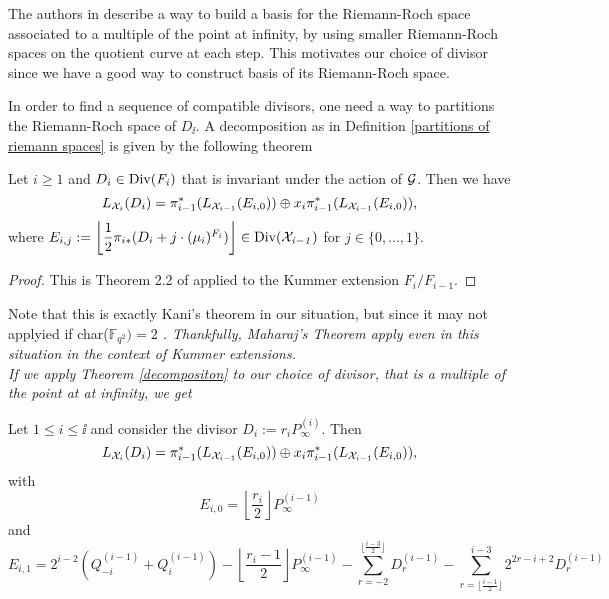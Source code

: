 \documentclass[10pt]{article}
\begin{document}
\s

\begin{rq1} \label{choice of P_inf}
The authors in \cite{NOQ} describe a way to build a basis for the Riemann-Roch space associated to a multiple of the point at infinity, by using smaller Riemann-Roch spaces on the quotient curve at each step. This motivates our choice of divisor since we have a good way to construct basis of its Riemann-Roch space.
\end{rq1}

\s

In order to find a sequence of compatible divisors, one need a way to partitions the Riemann-Roch space of $D_{\ii}$. A decomposition as in Definition \ref{partitions of riemann spaces} is given by the following theorem 

\s

\begin{theorem} \label{decompositon}
Let $i \geq 1$ and $D_i \in \rm Div \it (F_i)$ that is invariant under the action of $\mathcal{G}$. Then we have 
\[L_{\mathcal{X}_i}(D_i) = \pi_{i-1}^*(L_{\mathcal{X}_{i-1}}(E_{i,0})) \oplus  x_i \pi_{i-1}^*(L_{\mathcal{X}_{i-1}}(E_{i,0})),\]
where $E_{i,j} := \left\lfloor \dfrac{1}{2} \pi_{i*}(D_i+j \cdot (\mu_i)^{F_i})\right\rfloor \in \rm Div \it (\mathcal{X}_{i-1})$ for $j \in \{0,...,1\}$.
\end{theorem}

\s

\begin{proof}
This is Theorem 2.2 of \cite{MAH} applied to the Kummer extension $F_i/F_{i-1}$.
\end{proof}

\s

Note that this is exactly Kani's theorem in our situation, but since it may not applyied if char(\it $\mathbb{F}_{q^2})=2$ \rm . Thankfully, Maharaj's Theorem apply even in this situation in the context of Kummer extensions. \\
If we apply Theorem \ref{decompositon} to our choice of divisor, that is a multiple of the point at at infinity, we get

\s

\begin{corollary} \label{our decomposition}
Let $1 \leq i \leq \ii$ and consider the divisor $D_i := r_i P_{\infty}^{(i)}$. Then
\[ L_{\mathcal{X}_i}(D_i) = \pi_{i-1}^*(L_{\mathcal{X}_{i-1}}(E_{i,0})) \oplus  x_i \pi_{i-1}^*(L_{\mathcal{X}_{i-1}}(E_{i,0})),\]
with 
\[E_{i,0} = \left \lfloor \frac{r_i}{2}\right\rfloor P_{\infty}^{(i-1)}\]
and 
\[E_{i,1} = 2^{i-2}(Q_{-i}^{(i-1)}+Q_{i}^{(i-1)}) - \left \lfloor \frac{r_i-1}{2}\right\rfloor P_{\infty}^{(i-1)} - \sum\limits_{r=-2}^{\lfloor \frac{i-3}{2}\rfloor} D_r^{(i-1)} - \sum\limits_{r=\lfloor \frac{i-1}{2}\rfloor}^{i-3} 2^{2r-i+2}D_r^{(i-1)}\]
\end{corollary}
\end{document}
